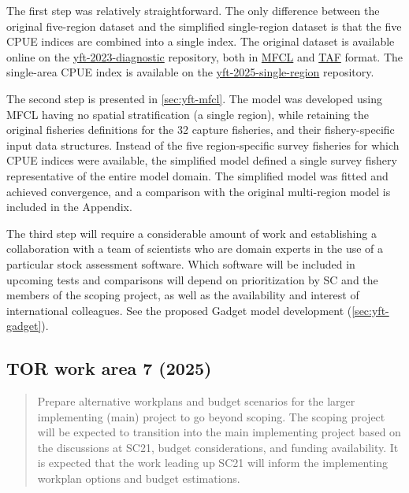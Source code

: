 \documentclass{SCreport}
\newcommand\ofpsam{https://github.com/PacificCommunity/ofp-sam}
\begin{document}
The first step was relatively straightforward. The only difference between the
original five-region dataset and the simplified single-region dataset is that
the five CPUE indices are combined into a single index. The original dataset is
available online on the \href{\ofpsam-yft-2023-diagnostic}{yft-2023-diagnostic}
repository, both in \href{\ofpsam-yft-2023-diagnostic/tree/main/MFCL}{MFCL} and
\href{\ofpsam-yft-2023-diagnostic/tree/main/TAF/data}{TAF} format. The
single-area CPUE index is available on the
\href{\ofpsam-yft-2025-single-region/blob/main/data/cpue/cpue_quarter.csv}
{yft-2025-single-region} repository.

The second step is presented in \autoref{sec:yft-mfcl}. The model was developed
using MFCL having no spatial stratification (a single region), while retaining
the original fisheries definitions for the 32 capture fisheries, and their
fishery-specific input data structures. Instead of the five region-specific
survey fisheries for which CPUE indices were available, the simplified model
defined a single survey fishery representative of the entire model domain. The
simplified model was fitted and achieved convergence, and a comparison with the
original multi-region model is included in the Appendix.

The third step will require a considerable amount of work and establishing a
collaboration with a team of scientists who are domain experts in the use of a
particular stock assessment software. Which software will be included in
upcoming tests and comparisons will depend on prioritization by SC and the
members of the scoping project, as well as the availability and interest of
international colleagues. See the proposed Gadget model development
(\autoref{sec:yft-gadget}).

\vspace{2ex}

\subsection{TOR work area 7 (2025)}

\begin{quote}\sf
  Prepare alternative workplans and budget scenarios for the larger implementing
  (main) project to go beyond scoping. The scoping project will be expected to
  transition into the main implementing project based on the discussions at
  SC21, budget considerations, and funding availability. It is expected that the
  work leading up SC21 will inform the implementing workplan options and budget
  estimations.
\end{quote}
\end{document}
